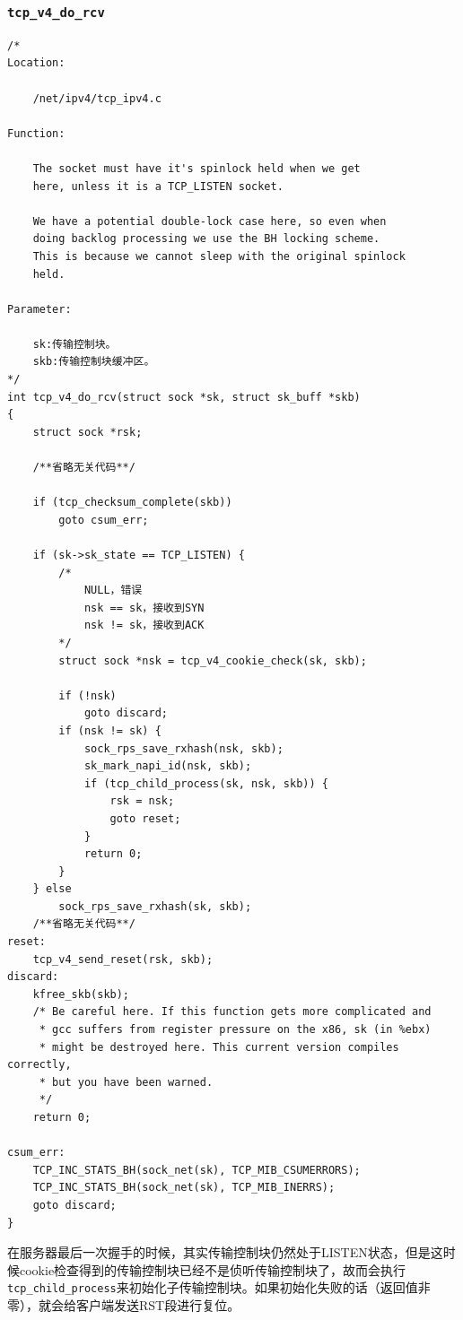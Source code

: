			\subsubsection{\texttt{tcp_v4_do_rcv}}
				\label{ServerReceiveACK:tcp_v4_do_rcv}
\begin{verbatim}
/* 
Location:

	/net/ipv4/tcp_ipv4.c

Function:

	The socket must have it's spinlock held when we get
	here, unless it is a TCP_LISTEN socket.

	We have a potential double-lock case here, so even when
	doing backlog processing we use the BH locking scheme.
	This is because we cannot sleep with the original spinlock
	held.

Parameter:

	sk:传输控制块。
	skb:传输控制块缓冲区。
*/
int tcp_v4_do_rcv(struct sock *sk, struct sk_buff *skb)
{
    struct sock *rsk;

    /**省略无关代码**/

    if (tcp_checksum_complete(skb))
        goto csum_err;

    if (sk->sk_state == TCP_LISTEN) {
		/*
			NULL，错误 
			nsk == sk，接收到SYN 
			nsk != sk，接收到ACK 
		*/
        struct sock *nsk = tcp_v4_cookie_check(sk, skb);

        if (!nsk)
            goto discard;
        if (nsk != sk) {
            sock_rps_save_rxhash(nsk, skb);
            sk_mark_napi_id(nsk, skb);
            if (tcp_child_process(sk, nsk, skb)) {
                rsk = nsk;
                goto reset;
            }
            return 0;
        }
    } else
        sock_rps_save_rxhash(sk, skb);
    /**省略无关代码**/
reset:
    tcp_v4_send_reset(rsk, skb);
discard:
    kfree_skb(skb);
    /* Be careful here. If this function gets more complicated and
     * gcc suffers from register pressure on the x86, sk (in %ebx)
     * might be destroyed here. This current version compiles correctly,
     * but you have been warned.
     */
    return 0;

csum_err:
    TCP_INC_STATS_BH(sock_net(sk), TCP_MIB_CSUMERRORS);
    TCP_INC_STATS_BH(sock_net(sk), TCP_MIB_INERRS);
    goto discard;
}
\end{verbatim}
                    在服务器最后一次握手的时候，其实传输控制块仍然处于LISTEN状态，但是这时候cookie检查得到的传输控制块已经不是侦听传输控制块了，故而会执行\texttt{tcp_child_process}来初始化子传输控制块。如果初始化失败的话（返回值非零），就会给客户端发送RST段进行复位。

